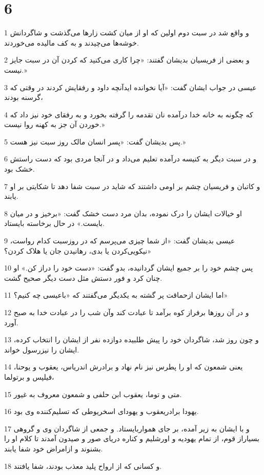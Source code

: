 \chapter{6}

\par 1 و واقع شد در سبت دوم اولین که او از میان کشت زارها می‌گذشت و شاگردانش خوشه‌ها می‌چیدند و به کف مالیده می‌خوردند.
\par 2 و بعضی از فریسیان بدیشان گفتند: «چرا کاری می‌کنید که کردن آن در سبت جایز نیست.»
\par 3 عیسی در جواب ایشان گفت: «آیا نخوانده ایدآنچه داود و رفقایش کردند در وقتی که گرسنه بودند،
\par 4 که چگونه به خانه خدا درآمده نان تقدمه را گرفته بخورد و به رفقای خود نیز داد که خوردن آن جز به کهنه روا نیست.»
\par 5 پس بدیشان گفت: «پسر انسان مالک روز سبت نیز هست.»
\par 6 و در سبت دیگر به کنیسه درآمده تعلیم می‌داد و در آنجا مردی بود که دست راستش خشک بود.
\par 7 و کاتبان و فریسیان چشم بر اومی داشتند که شاید در سبت شفا دهد تا شکایتی بر او یابند.
\par 8 او خیالات ایشان را درک نموده، بدان مرد دست خشک گفت: «برخیز و در میان بایست.» در حال برخاسته بایستاد.
\par 9 عیسی بدیشان گفت: «از شما چیزی می‌پرسم که در روزسبت کدام رواست، نیکویی‌کردن یا بدی، رهانیدن جان یا هلاک کردن؟»
\par 10 پس چشم خود را بر جمیع ایشان گردانیده، بدو گفت: «دست خود را دراز کن.» او چنان کرد و فور دستش مثل دست دیگر صحیح گشت.
\par 11 اما ایشان ازحماقت پر گشته به یکدیگر می‌گفتند که «باعیسی چه کنیم؟»
\par 12 و در آن روزها برفراز کوه برآمد تا عبادت کند وآن شب را در عبادت خدا به صبح آورد.
\par 13 و چون روز شد، شاگردان خود را پیش طلبیده دوازده نفر از ایشان را انتخاب کرده، ایشان را نیزرسول خواند.
\par 14 یعنی شمعون که او را پطرس نیز نام نهاد و برادرش اندریاس، یعقوب و یوحنا، فیلپس و برتولما،
\par 15 متی و توما، یعقوب ابن حلفی و شمعون معروف به غیور.
\par 16 یهودا برادریعقوب و یهودای اسخریوطی که تسلیم‌کننده وی بود.
\par 17 و با ایشان به زیر آمده، بر جای همواربایستاد. و جمعی از شاگردان وی و گروهی بسیاراز قوم، از تمام یهودیه و اورشلیم و کناره دریای صور و صیدون آمدند تا کلام او را بشنوند و ازامراض خود شفا یابند.
\par 18 و کسانی که از ارواح پلید معذب بودند، شفا یافتند.
